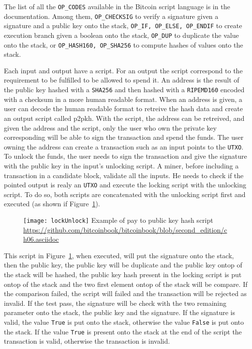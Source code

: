 The list of all the \texttt{OP\_CODES} available in the Bitcoin script language is
in the documentation. Among them, \texttt{OP\_CHECKSIG} to verify a signature given
a signature and a public key onto the stack, \texttt{OP\_IF, OP\_ELSE, OP\_ENDIF} to
create execution branch given a boolean onto the stack, \texttt{OP\_DUP} to duplicate
the value onto the stack, or \texttt{OP\_HASH160, OP\_SHA256} to compute hashes of
values onto the stack.

Each input and output have a script. For an output the script correspond to the
requirement to be fulfilled to be allowed to spend it. An address is the result of
the public key hashed with a \texttt{SHA256} and then hashed with a \texttt{RIPEMD160}
encoded with a checksum in a more human readable format. When an address is given,
a user can decode the human readable format to retreive the hash data and create
an output script called \gls{p2pkh}. With the script, the address can be retreived,
and given the address and the script, only the user who own the private key
corresponding will be able to sign the transaction and spend the funds. The user
owning the address can create a transaction such as an input points to the \texttt{UTXO}.
To unlock the funds, the user needs to sign the transaction and give the signature
with the public key in the input's unlocking script. A miner, before including a
transaction in a candidate block, validate all the inputs. He needs to check if the
pointed output is realy an \texttt{UTXO} and execute the locking script with the
unlocking script. To do so, both scripts are concatenated with the unlocking script
first and executed (as shown if Figure~\ref{fig:lockUnlock}).

\begin{figure}[H]
	\centering
	\texttt{[image: lockUnlock]}
  {Example of pay to public key hash script}
	{\url{https://github.com/bitcoinbook/bitcoinbook/blob/second_edition/ch06.asciidoc}}
	\label{fig:lockUnlock}
\end{figure}

This script in Figure~\ref{fig:lockUnlock}, when executed, will put the signature
onto the stack, then the public key, the public key will be duplicate and the
public key ontop of the stack will be hashed, the public key hash present in the
locking script is put ontop of the stack and the two first element ontop of the
stack will be compare. If the comparison failed, the script will failed and the
transaction will be rejected as invalid. If the test pass, the signature will
be check with the two remaining parameter onto the stack, the public key and the
signature. If the signature is valid, the value \texttt{True} is put onto the
stack, otherwise the value \texttt{False} is put onto the stack. If the value
\texttt{True} is present onto the stack at the end of the script the transaction
is valid, otherwise the transaction is invalid.

